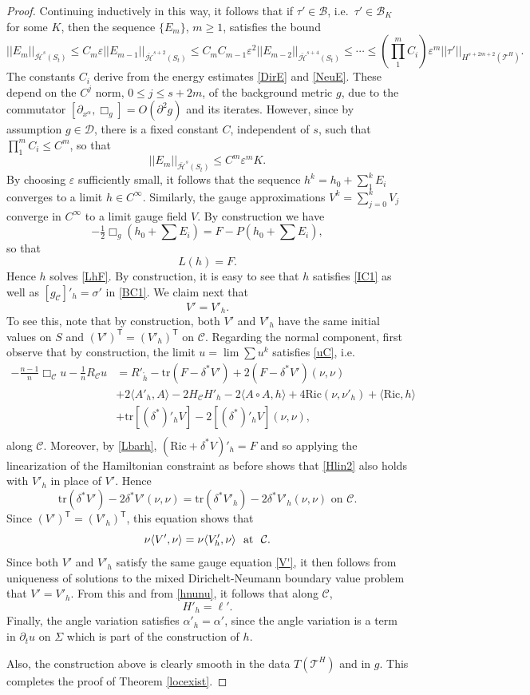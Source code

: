 \documentclass[10pt]{amsart}
\renewcommand{\a}{\alpha}
\renewcommand{\d}{\delta}
\newcommand{\e}{\varepsilon}
\newcommand{\s}{\sigma}
\newcommand{\Si}{\Sigma}
\newcommand{\cC}{{\mathcal C}}
\newcommand{\cT}{{\mathcal T}}
\newcommand{\cB}{{\mathcal B}}
\newcommand{\cH}{{\mathcal H}}
\newcommand{\cD}{{\mathcal D}}
\newcommand{\Ric}{\mathrm{Ric}}
\newcommand{\tT}{\mathsf{T}}
\newcommand{\be}{\begin{equation}}
\newcommand{\ee}{\end{equation}}
\newcommand{\tr}{\mathrm{tr}}
\newcommand{\p}{\partial}
\newcommand{\<}{\langle}
\renewcommand{\>}{\rangle}
\theoremstyle{plain}
\theoremstyle{remark}
\theoremstyle{definition}
\numberwithin{equation}{section}
\begin{document}
\begin{proof}
   Continuing inductively in this way, it follows that if $\tau' \in \cB$, i.e.~$\tau' \in \cB_K$ for some $K$, then the sequence $\{E_m\}$, 
$m \geq 1$, satisfies the bound 
\be \label{Embound}
||E_m||_{\bar \cH^s(S_t)} \leq C_m\e ||E_{m-1}||_{\bar \cH^{s+2}(S_t)} \leq C_m C_{m-1} \e^2 ||E_{m-2}||_{\bar \cH^{s+4}(S_t)} \leq \cdots \leq 
(\prod_1^m C_i) \e^m ||\tau'||_{H^{s+2m+2}(\cT^H)}.
\ee
The constants $C_i$ derive from the energy estimates \eqref{DirE} and \eqref{NeuE}. These depend on the $C^j$ norm, $0 \leq j \leq s+2m$, of the 
background metric $g$, due to the commutator $[\p_{x^{\a}}, \Box_g] = O(\p^2 g)$ and its iterates. However, since by assumption 
$g \in \cD$, there is a fixed constant $C$, independent of $s$, such that $\prod_1^m C_i \leq C^m$, so that  
$$||E_m||_{\bar \cH^s(S_t)} \leq C^m \e^m K.$$
By choosing $\e$ sufficiently small, it follows that the sequence $h^k = h_0 + \sum_1^k E_i$ converges to a limit $h \in C^{\infty}$. Similarly, 
the gauge approximations $V^k = \sum_{j=0}^k V_j$ converge in $C^{\infty}$ to a limit gauge field $V$. 
By construction we have 
$$-\tfrac{1}{2}\Box_g(h_0 + \sum E_i)  = F - P(h_0 + \sum E_i),$$
so that 
\be \label{Lbarh}
L(h) = F.
\ee
Hence $h$ solves \eqref{LhF}. By construction, it is easy to see that $h$ satisfies \eqref{IC1} as well as $[g_{\cC}]'_{h} = \s'$ in \eqref{BC1}. 
We claim next that  
$$V' = V'_h.$$ 
To see this, note that by construction, both $V'$ and $V'_h$ have the same initial values on $S$ and $(V')^{\tT} = (V'_h)^{\tT}$ on $\cC$. Regarding the 
normal component, first observe that by construction, the limit $u = \lim \sum u^k$ satisfies \eqref{uC}, i.e. 
\be \label{Hlin2}
\begin{split} 
-\tfrac{n-1}{n} \Box_{\cC} u - \tfrac{1}{n}R_{\cC}u & =  R'_{\ring{h}} - \tr(F - \d^* V') + 2(F - \d^* V')(\nu,\nu)\\
 &+2\<A'_h, A\> - 2H_\cC H'_h - 2\<A\circ A, h\> + 4\Ric(\nu,\nu'_h) + \<\Ric, h\>\\
&+ \tr [(\d^*)'_h V] - 2[(\d^*)'_h V](\nu,\nu), \\
\end{split}
\ee
along $\cC$. Moreover, by \eqref{Lbarh}, $(\Ric + \d^*V)'_h = F$ and so applying the linearization of the Hamiltonian constraint as before shows 
that \eqref{Hlin2} also holds with $V'_h$ in place of $V'$. Hence  
$$\tr(\d^*V')-2\d^* V'(\nu,\nu) = \tr(\d^* V'_h) - 2\d^*  V'_h(\nu,\nu) \mbox{ on }\cC.$$
Since $(V')^{\tT} = (V'_h)^{\tT}$, this equation shows that 
$$\nu \<V', \nu\> = \nu\<V'_h, \nu\> \ \ {\rm at} \ \ \cC.$$
Since both $V'$ and $V'_h$ satisfy the same gauge equation \eqref{V'}, it then follows from uniqueness of solutions to the mixed Dirichelt-Neumann 
boundary value problem that $V' = V'_h$. From this and from \eqref{hnunu}, it follows that along $\cC$, 
$$H'_h = \ell'.$$ 
Finally, the angle variation satisfies $\a'_h = \a'$, since the angle variation is a term in $\p_t u$ on $\Si$ which is part of the construction of $h$. 

Also, the construction above  is clearly smooth in the data $T(\cT^H)$ and in $g$. This completes the proof of Theorem \ref{locexist}.  

\end{proof}
\end{document}
